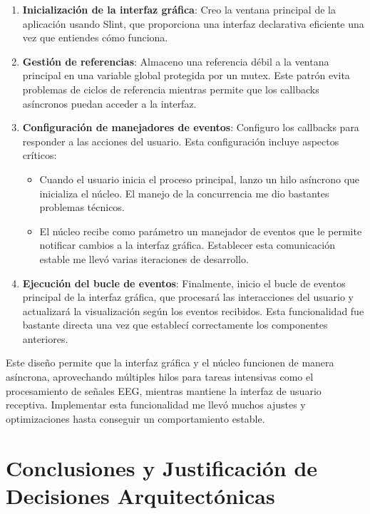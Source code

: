 \begin{enumerate}
    \item \textbf{Inicialización de la interfaz gráfica}: Creo la ventana principal de la aplicación usando Slint, que proporciona una interfaz declarativa eficiente una vez que entiendes cómo funciona.
    
    \item \textbf{Gestión de referencias}: Almaceno una referencia débil a la ventana principal en una variable global protegida por un mutex. Este patrón evita problemas de ciclos de referencia mientras permite que los callbacks asíncronos puedan acceder a la interfaz.
    
    \item \textbf{Configuración de manejadores de eventos}: Configuro los callbacks para responder a las acciones del usuario. Esta configuración incluye aspectos críticos:
    \begin{itemize}
        \item Cuando el usuario inicia el proceso principal, lanzo un hilo asíncrono que inicializa el núcleo. El manejo de la concurrencia me dio bastantes problemas técnicos.
        \item El núcleo recibe como parámetro un manejador de eventos que le permite notificar cambios a la interfaz gráfica. Establecer esta comunicación estable me llevó varias iteraciones de desarrollo.
    \end{itemize}
    
    \item \textbf{Ejecución del bucle de eventos}: Finalmente, inicio el bucle de eventos principal de la interfaz gráfica, que procesará las interacciones del usuario y actualizará la visualización según los eventos recibidos. Esta funcionalidad fue bastante directa una vez que establecí correctamente los componentes anteriores.
\end{enumerate}

Este diseño permite que la interfaz gráfica y el núcleo funcionen de manera asíncrona, aprovechando múltiples hilos para tareas intensivas como el procesamiento de señales EEG, mientras mantiene la interfaz de usuario receptiva. Implementar esta funcionalidad me llevó muchos ajustes y optimizaciones hasta conseguir un comportamiento estable.

\newpage
\section{Conclusiones y Justificación de Decisiones Arquitectónicas}

